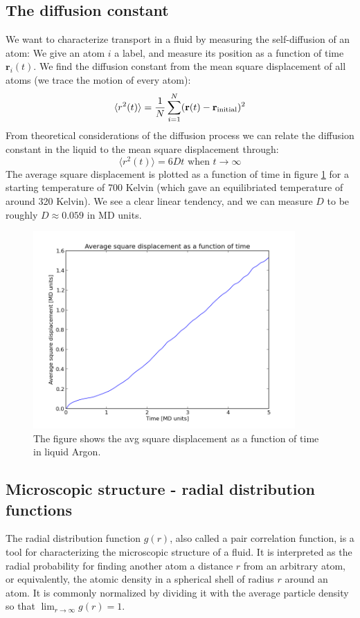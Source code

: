 \documentclass[12pt]{article}
\def\rvec{\textbf{r}}
\begin{document}
\subsection{The diffusion constant}
We want to characterize transport in a fluid by measuring the self-diffusion of an atom: We give an atom $i$ a label, and measure its position as a function of time $\rvec_i(t)$. We find the diffusion constant from the mean square displacement of all atoms (we trace the motion of every atom):
\begin{equation}
 \langle r^2(t) \rangle = {1 \over N}\sum_{i=1}^N (\rvec(t) - \rvec_{\text{initial}})^2
\end{equation}
From theoretical considerations of the diffusion process we can relate the diffusion constant in the liquid to the mean square displacement through:
\begin{equation}
 \langle r^2(t) \rangle = 6Dt \text{ when } t \rightarrow \infty
\end{equation}
The average square displacement is plotted as a function of time in figure \ref{fig:10} for a starting temperature of 700 Kelvin (which gave an equilibriated temperature of around 320 Kelvin). We see a clear linear tendency, and we can measure $D$ to be roughly $D \approx 0.059$ in MD units.

  \begin{figure}
\centering
\includegraphics[width=10cm]{avgsqdisp.png}
\caption{\label{fig:10} The figure shows the avg square displacement as a function of time in liquid Argon.}
\end{figure}

\subsection{Microscopic structure - radial distribution functions}
The radial distribution function $g(r)$, also called a pair correlation function, is a tool for characterizing the microscopic structure of a fluid. It is interpreted as the radial probability for finding another atom a distance $r$ from an arbitrary atom, or equivalently, the atomic density in a spherical shell of radius $r$ around an atom. It is commonly normalized by dividing it with the average particle density so that $\lim_{r\rightarrow \infty} g(r) = 1$.
\end{document}
